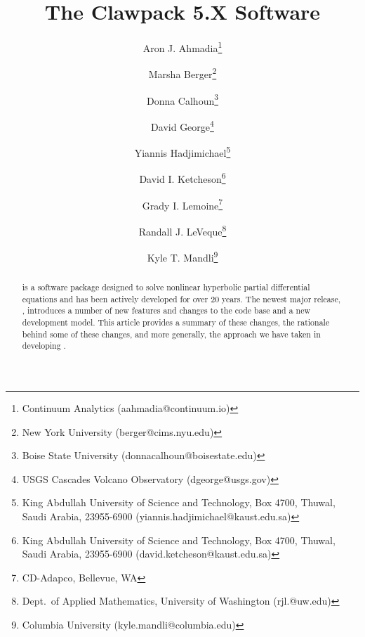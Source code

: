 \documentclass[]{article}
\begin{document}
\ifpdf
{}
\else
{}
\fi

\title{The Clawpack 5.X Software}


\author{
        Aron J. Ahmadia\thanks{
            Continuum Analytics (\mbox{aahmadia@continuum.io})} \and
        Marsha Berger\thanks{
            New York University (\mbox{berger@cims.nyu.edu})} \and
        Donna Calhoun\thanks{
            Boise State University (\mbox{donnacalhoun@boisestate.edu})} \and
        David George\thanks{
            USGS Cascades Volcano Observatory (\mbox{dgeorge@usgs.gov})} \and
        Yiannis Hadjimichael\thanks{
            King Abdullah University of Science and Technology, Box 4700, Thuwal, Saudi Arabia, 23955-6900 (\mbox{yiannis.hadjimichael@kaust.edu.sa})} \and
        David I. Ketcheson\thanks{
            King Abdullah University of Science and Technology, Box 4700, Thuwal, Saudi Arabia, 23955-6900 (\mbox{david.ketcheson@kaust.edu.sa})} \and
        Grady I. Lemoine\thanks{
            CD-Adapco, Bellevue, WA} \and
        Randall J. LeVeque\thanks{
            Dept.\ of Applied Mathematics, University of Washington (\mbox{rjl.@uw.edu})} \and
        Kyle T. Mandli\thanks{
            Columbia University (\mbox{kyle.mandli@columbia.edu})}
        }

\maketitle

\begin{abstract}
    \clawpack is a software package designed to solve nonlinear
hyperbolic partial differential equations and has been actively developed
for over 20 years.  The newest major release, , introduces
a number of new features and changes to the code base and a new
development model.  This article provides a summary of these changes,
the rationale behind some of these changes, and more generally, the
approach we have taken in developing \clawpack.
\end{abstract}











\end{document}
